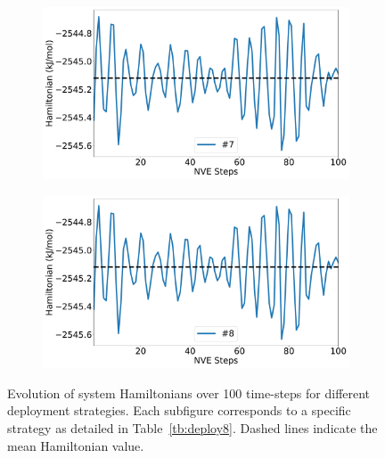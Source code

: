 \begin{figure}[htbp]
\begin{subfigure}{0.48\textwidth}
\end{subfigure}
\\
\begin{subfigure}{0.48\textwidth}
\includegraphics[width=\linewidth]{figs/drift7.pdf}
\end{subfigure}
\begin{subfigure}{0.48\textwidth}
\includegraphics[width=\linewidth]{figs/drift8.pdf}
\end{subfigure}
\caption{Evolution of system Hamiltonians
over 100 time-steps for different deployment strategies.
Each subfigure corresponds to a specific strategy
as detailed in Table~\ref{tb:deploy8}.
Dashed lines indicate the mean Hamiltonian value.}\label{fig:drift}
\end{figure}
